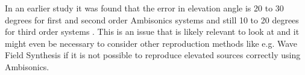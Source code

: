 In an earlier study it was found that the error in elevation angle is 20 to 30 degrees for first and 
second order Ambisonics systems and still 10 to 20 degrees for third order 
systems \cite{Power2013}. This is an issue that is likely relevant to look at 
and it might even be necessary to consider other reproduction methods like e.g. Wave Field Synthesis if it is 
not possible to reproduce elevated sources correctly using Ambisonics.






